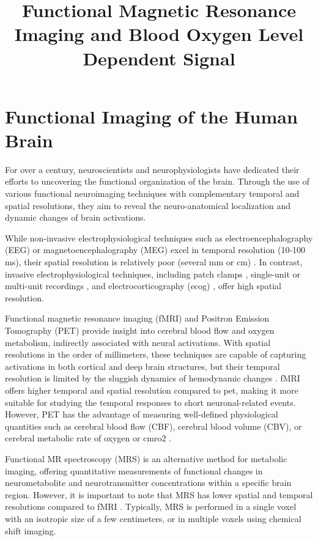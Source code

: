 \title{Functional Magnetic Resonance Imaging and Blood Oxygen Level Dependent Signal}
\label{cha:intro}

\section{Functional Imaging of the Human Brain}

For over a century, neuroscientists and neurophysiologists have dedicated their
efforts to uncovering the functional organization of the brain. Through the use
of various functional neuroimaging techniques with complementary temporal and
spatial resolutions, they aim to reveal the neuro-anatomical localization and
dynamic changes of brain activations.

While non-invasive electrophysiological techniques such as
electroencephalography (EEG) or magnetoencephalography (MEG) excel in temporal
resolution (10-100 ms), their spatial resolution is relatively poor (several mm
or cm)
\citep{Baillet2001Electromagneticbrainmapping,Haemaelaeinen1993Magnetoencephalographytheoryinstrumentationapplications}.
In contrast, invasive electrophysiological techniques, including patch clamps
\citep{Neher1978extracellularpatchclamp}, single-unit or multi-unit recordings
\citep{Arieli1995Coherentspatiotemporalpatterns}, and electrocorticography
(\acrshort*{ecog})
\citep{Miller2007Realtimefunctional,Nir2008Interhemisphericcorrelationsslow},
offer high spatial resolution.

Functional magnetic resonance imaging (fMRI) and Positron Emission Tomography
(PET) provide insight into cerebral blood flow and oxygen metabolism, indirectly
associated with neural activations. With spatial resolutions in the order of
millimeters, these techniques are capable of capturing activations in both
cortical and deep brain structures, but their temporal resolution is limited by
the sluggish dynamics of hemodynamic changes
\citep{Dale2001Spatiotemporalmappingbrain}. fMRI offers higher temporal and
spatial resolution compared to \acrshort*{pet}, making it more suitable for
studying the temporal responses to short neuronal-related events. However, PET
has the advantage of measuring well-defined physiological quantities such as
cerebral blood flow (CBF), cerebral blood volume (CBV), or cerebral metabolic
rate of oxygen or \acrshort*{cmro2}
\citep{Fox1986Mappinghumanvisual,Friston1993FunctionalConnectivityPrincipal}.

Functional MR spectroscopy (MRS) is an alternative method for metabolic imaging,
offering quantitative measurements of functional changes in neurometabolite and
neurotransmitter concentrations within a specific brain region. However, it is
important to note that MRS has lower spatial and temporal resolutions compared
to fMRI \citep{Morris1999Magneticresonanceimaging}. Typically, MRS is performed
in a single voxel with an isotropic size of a few centimeters, or in multiple
voxels using chemical shift imaging.

